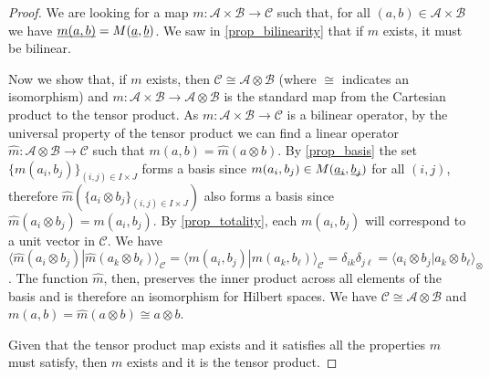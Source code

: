 \documentclass[aps,prl,amsmath,amssymb,twocolumn,nofootinbib]{revtex4}
\theoremstyle{plain}
\theoremstyle{definition}
\theoremstyle{remark}
\newcommand{\pj}[1] {\underbar{$#1$}}
\def\>{\rangle}
\def\<{\langle}
\begin{document}
	\begin{proof}
		We are looking for a map $m : \mathcal{A} \times \mathcal{B} \to \mathcal{C}$ such that, for all $(a,b) \in \mathcal{A} \times \mathcal{B}$ we have $\pj{m(a,b)} = M(\pj{a}, \pj{b})$. We saw in \ref{prop_bilinearity} that if $m$ exists, it must be bilinear.
		
		Now we show that, if $m$ exists, then $\mathcal{C} \cong \mathcal{A}
		\otimes \mathcal{B}$ (where $\cong$ indicates an isomorphism) and $m :
		\mathcal{A} \times \mathcal{B} \to \mathcal{A} \otimes \mathcal{B}$ is
		the standard map from the Cartesian product to the tensor product. As $m
		: \mathcal{A} \times \mathcal{B} \to \mathcal{C}$ is a bilinear
		operator, by the universal property of the tensor product we can find
		a linear operator $\hat{m} : \mathcal{A} \otimes \mathcal{B} \to
		\mathcal{C}$ such that $m(a, b) = \hat{m}(a \otimes b)$. By
		\ref{prop_basis} the set $\{ m(a_i, b_j)\}_{(i,j) \in I \times J}$
		forms a basis since $ m(a_i, b_j) \in M(\pj{a_i}, \pj{b_j})$ for all
		$(i, j)$, therefore $\hat{m}(\{ a_i \otimes b_j\}_{(i,j) \in I \times
			J})$ also forms a basis since $\hat{m}(a_i\otimes b_j)=m(a_i, b_j)$.
		By \ref{prop_totality}, each $m(a_i,b_j)$ will correspond to a unit
		vector in $\mathcal{C}$. We have $\<\hat m(a_i\otimes b_j)| \hat
		m(a_k\otimes b_\ell)\>_\mathcal{C} =\<m(a_i, b_j)| m(a_k,
		b_\ell)\>_\mathcal{C} = \delta_{ik}\delta_{j\ell} = \<a_i\otimes b_j|
		a_k \otimes b_\ell\>_{\otimes}$. The function $\hat{m}$, then,
		preserves the inner product across all elements of the basis and is
		therefore an isomorphism for Hilbert spaces. We have $\mathcal{C}
		\cong \mathcal{A} \otimes \mathcal{B}$ and $m(a, b) = \hat{m}(a
		\otimes b) \cong a \otimes b$.
		
		Given that the tensor product map exists and it satisfies all the properties $m$ must satisfy, then $m$ exists and it is the tensor product.
	\end{proof}
	
\end{document}
